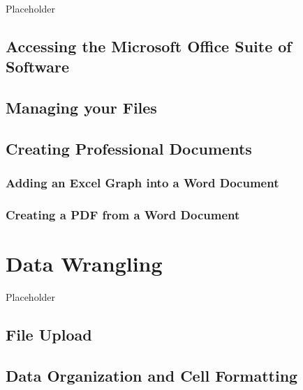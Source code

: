 \documentclass[
]{book}
\begin{document}
Placeholder

\hypertarget{accessing-the-microsoft-office-suite-of-software}{%
\section{Accessing the Microsoft Office Suite of Software}\label{accessing-the-microsoft-office-suite-of-software}}

\hypertarget{managing-your-files}{%
\section{Managing your Files}\label{managing-your-files}}

\hypertarget{creating-professional-documents}{%
\section{Creating Professional Documents}\label{creating-professional-documents}}

\hypertarget{adding-an-excel-graph-into-a-word-document}{%
\subsection{Adding an Excel Graph into a Word Document}\label{adding-an-excel-graph-into-a-word-document}}

\hypertarget{creating-a-pdf-from-a-word-document}{%
\subsection{Creating a PDF from a Word Document}\label{creating-a-pdf-from-a-word-document}}

\hypertarget{data-wrangling}{%
\chapter{Data Wrangling}\label{data-wrangling}}

Placeholder

\hypertarget{file-upload}{%
\section{File Upload}\label{file-upload}}

\hypertarget{data-organization-and-cell-formatting}{%
\section{Data Organization and Cell Formatting}\label{data-organization-and-cell-formatting}}
\end{document}
